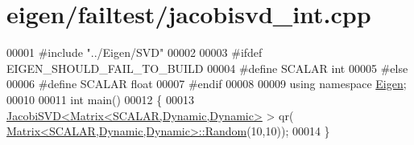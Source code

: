 \hypertarget{eigen_2failtest_2jacobisvd__int_8cpp_source}{}\section{eigen/failtest/jacobisvd\+\_\+int.cpp}
\label{eigen_2failtest_2jacobisvd__int_8cpp_source}

\begin{DoxyCode}
00001 \textcolor{preprocessor}{#include "../Eigen/SVD"}
00002 
00003 \textcolor{preprocessor}{#ifdef EIGEN\_SHOULD\_FAIL\_TO\_BUILD}
00004 \textcolor{preprocessor}{#define SCALAR int}
00005 \textcolor{preprocessor}{#else}
00006 \textcolor{preprocessor}{#define SCALAR float}
00007 \textcolor{preprocessor}{#endif}
00008 
00009 \textcolor{keyword}{using namespace }\hyperlink{namespace_eigen}{Eigen};
00010 
00011 \textcolor{keywordtype}{int} main()
00012 \{
00013   \hyperlink{group___s_v_d___module_class_eigen_1_1_jacobi_s_v_d}{JacobiSVD<Matrix<SCALAR,Dynamic,Dynamic>} > qr(
      \hyperlink{group___core___module_class_eigen_1_1_matrix}{Matrix<SCALAR,Dynamic,Dynamic>::Random}(10,10));
00014 \}
\end{DoxyCode}
